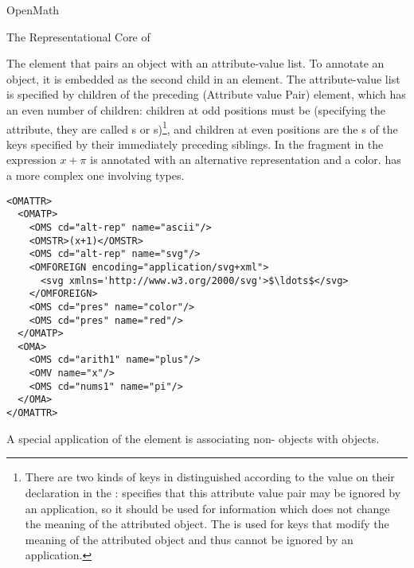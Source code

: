 \begin{omgroup}[id=mobj,short=Mathematical Objects]
\begin{omgroup}[id=openmath]{OpenMath}
\begin{module}[id=OpenMath]
\begin{omgroup}[id=om.core]{The Representational Core of {\openmath}}
\begin{definition}[id=omattr.def]
  The {} element that pairs an {\openmath} object with an
  attribute-value list. To annotate an {\openmath} object, it is embedded as the second
  child in an {} element. The attribute-value list is specified
  by children of the preceding {} (Attribute value Pair) element,
  which has an even number of children: children at odd positions must be
  {} (specifying the attribute, they are called {s} or
  {s})\footnote{There are two kinds of keys in {\openmath} distinguished
    according to the {} value on their {}
    declaration in the {}:
    {} specifies that this attribute value pair may be
    ignored by an application, so it should be used for information which does not change
    the meaning of the attributed {\openmath} object. The {} is
    used for keys that modify the meaning of the attributed {\openmath} object and thus
    cannot be ignored by an application.}, and children at even positions are the
  {s} of the keys specified by their immediately preceding siblings. In the
  {\openmath} fragment in {} the expression $x+\pi$ is annotated with an
  alternative representation and a color.  {} has a more complex
  one involving types.
\end{definition}

\begin{lstlisting}[language=OpenMath,label=lst:omattr,mathescape,
                   caption={Associating Alternate Representations with an
                   {\openmath} Object},
                   numbers=none,index={OMATTR,OMATP}]
<OMATTR>
  <OMATP>
    <OMS cd="alt-rep" name="ascii"/>
    <OMSTR>(x+1)</OMSTR>
    <OMS cd="alt-rep" name="svg"/>
    <OMFOREIGN encoding="application/svg+xml">
      <svg xmlns='http://www.w3.org/2000/svg'>$\ldots$</svg>
    </OMFOREIGN>
    <OMS cd="pres" name="color"/>
    <OMS cd="pres" name="red"/>
  </OMATP>
  <OMA>
    <OMS cd="arith1" name="plus"/>
    <OMV name="x"/>
    <OMS cd="nums1" name="pi"/>
  </OMA>
</OMATTR>
\end{lstlisting}

A special application of the {} element is associating
non-{} objects with {\openmath} objects.


\end{omgroup}
\end{module}
\end{omgroup}
\end{omgroup}
